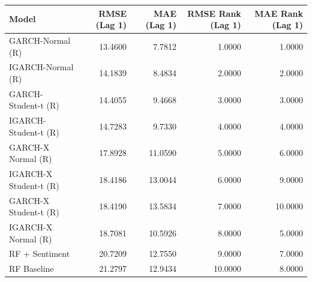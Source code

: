\begin{tabular}{lrrrr}
\toprule
Model & RMSE (Lag 1) & MAE (Lag 1) & RMSE Rank (Lag 1) & MAE Rank (Lag 1) \\
\midrule
GARCH-Normal (R) & 13.4600 & 7.7812 & 1.0000 & 1.0000 \\
IGARCH-Normal (R) & 14.1839 & 8.4834 & 2.0000 & 2.0000 \\
GARCH-Student-t (R) & 14.4055 & 9.4668 & 3.0000 & 3.0000 \\
IGARCH-Student-t (R) & 14.7283 & 9.7330 & 4.0000 & 4.0000 \\
GARCH-X Normal (R) & 17.8928 & 11.0590 & 5.0000 & 6.0000 \\
IGARCH-X Student-t (R) & 18.4186 & 13.0044 & 6.0000 & 9.0000 \\
GARCH-X Student-t (R) & 18.4190 & 13.5834 & 7.0000 & 10.0000 \\
IGARCH-X Normal (R) & 18.7081 & 10.5926 & 8.0000 & 5.0000 \\
RF + Sentiment & 20.7209 & 12.7550 & 9.0000 & 7.0000 \\
RF Baseline & 21.2797 & 12.9434 & 10.0000 & 8.0000 \\
\bottomrule
\end{tabular}
